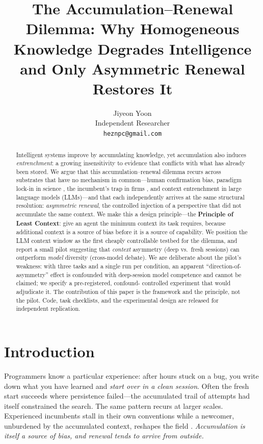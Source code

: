 \documentclass[12pt]{article}
\title{The Accumulation--Renewal Dilemma: Why Homogeneous Knowledge Degrades Intelligence and Only Asymmetric Renewal Restores It}
\author{Jiyeon Yoon\\
Independent Researcher\\
\texttt{heznpc@gmail.com}}
\date{}
\begin{document}
\maketitle

\begin{abstract}
Intelligent systems improve by accumulating knowledge, yet accumulation also
induces \emph{entrenchment}: a growing insensitivity to evidence that conflicts
with what has already been stored. We argue that this accumulation--renewal
dilemma recurs across substrates that have no mechanism in common---human
confirmation bias, paradigm lock-in in science \citep{kuhn1962structure},
the incumbent's trap in firms \citep{christensen1997innovator}, and context
entrenchment in large language models (LLMs)---and that each independently
arrives at the same structural resolution: \emph{asymmetric renewal}, the
controlled injection of a perspective that did not accumulate the same context.
We make this a design principle---the \textbf{Principle of Least Context}: give
an agent the minimum context its task requires, because additional context is a
source of bias before it is a source of capability. We position the LLM context
window as the first cheaply controllable testbed for the dilemma, and report a
small pilot suggesting that \emph{context} asymmetry (deep vs.\ fresh sessions)
can outperform \emph{model} diversity (cross-model debate). We are deliberate
about the pilot's weakness: with three tasks and a single run per condition, an
apparent ``direction-of-asymmetry'' effect is confounded with deep-session model
competence and cannot be claimed; we specify a pre-registered, confound-
controlled experiment that would adjudicate it. The contribution of this paper
is the framework and the principle, not the pilot. Code, task checklists, and
the experimental design are released for independent replication.
\end{abstract}

\section{Introduction}

Programmers know a particular experience: after hours stuck on a bug, you write
down what you have learned and \emph{start over in a clean session}. Often the
fresh start succeeds where persistence failed---the accumulated trail of
attempts had itself constrained the search. The same pattern recurs at larger
scales. Experienced incumbents stall in their own conventions while a newcomer,
unburdened by the accumulated context, reshapes the field
\citep{christensen1997innovator}. \emph{Accumulation is itself a source of bias,
and renewal tends to arrive from outside.}
\end{document}

